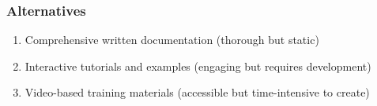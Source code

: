 \documentclass[11pt,a4paper]{article}
\begin{document}
\subsubsection{Alternatives}
\begin{enumerate}
    \item Comprehensive written documentation (thorough but static)
    \item Interactive tutorials and examples (engaging but requires development)
    \item Video-based training materials (accessible but time-intensive to create)
\end{enumerate}
\end{document}
